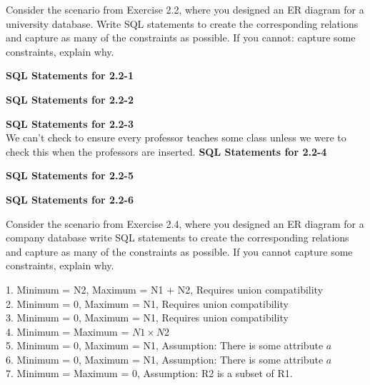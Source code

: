 




\homeworkheader{\classnameandsection}

\begin{problem}{3.12}
  Consider the scenario from Exercise 2.2, where you designed an ER diagram for a university database. Write SQL
  statements to create the corresponding relations and capture as many of the constraints as possible. If you cannot:
  capture some constraints, explain why.
  \begin{solution}
    \textbf{SQL Statements for 2.2-1}
    
    \textbf{SQL Statements for 2.2-2}
    
    \textbf{SQL Statements for 2.2-3} \\
    We can't check to ensure every professor teaches some class unless we were to check this when the professors are
    inserted.
    \br
    \textbf{SQL Statements for 2.2-4}
    
    \textbf{SQL Statements for 2.2-5}
    
    \textbf{SQL Statements for 2.2-6}
    
  \end{solution}
\end{problem}

\begin{problem}{3.14}
  Consider the scenario from Exercise 2.4, where you designed an ER diagram for a company database write SQL statements
  to create the corresponding relations and capture as many of the constraints as possible. If you cannot capture some
  constraints, explain why.
  \begin{solution}
    
  \end{solution}
\end{problem}

\begin{problem}{4.2}
  \begin{solution}
    1. Minimum = N2, Maximum = N1 + N2, Requires union compatibility\\
    2. Minimum = 0, Maximum = N1, Requires union compatibility\\
    3. Minimum = 0, Maximum = N1, Requires union compatibility \\
    4. Minimum = Maximum = $N1 \times N2$ \\
    5. Minimum = 0, Maximum = N1, Assumption: There is some attribute $a$ \\
    6. Minimum = 0, Maximum = N1, Assumption: There is some attribute $a$ \\
    7. Minimum = Maximum = 0, Assumption: R2 is a subset of R1.
  \end{solution}
\end{problem}

